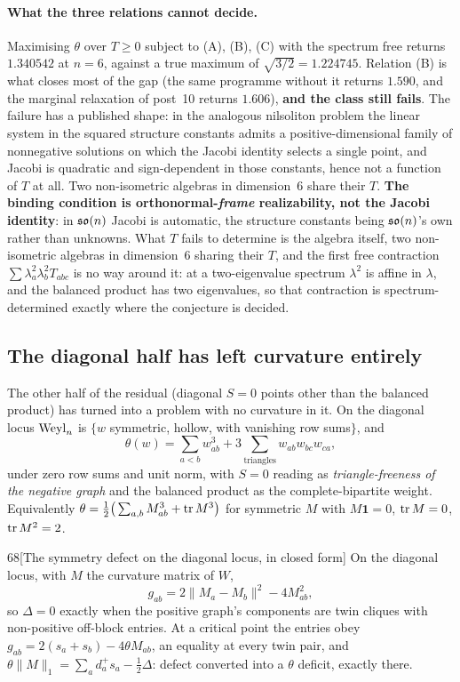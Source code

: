 \paragraph{What the three relations cannot decide.} Maximising $\theta$ over $T\ge0$ subject to (A), (B), (C) with the spectrum free returns $1.340542$ at $n=6$, against a true maximum of $\sqrt{3/2}=1.224745$. Relation (B) is what closes most of the gap (the same programme without it returns $1.590$, and the marginal relaxation of post~10 returns $1.606$), \textbf{and the class still fails}. The failure has a published shape: in the analogous nilsoliton problem the linear system in the squared structure constants admits a positive-dimensional family of nonnegative solutions on which the Jacobi identity selects a single point, and Jacobi is quadratic and sign-dependent in those constants, hence not a function of $T$ at all. Two non-isometric algebras in dimension~$6$ share their $T$. \textbf{The binding condition is orthonormal-\emph{frame} realizability, not the Jacobi identity}: in $\mathfrak{so}(n)$ Jacobi is automatic, the structure constants being $\mathfrak{so}(n)$'s own rather than unknowns. What $T$ fails to determine is the algebra itself, two non-isometric algebras in dimension~$6$ sharing their $T$, and the first free contraction $\sum\lambda_a^2\lambda_b^2T_{abc}$ is no way around it: at a two-eigenvalue spectrum $\lambda^2$ is affine in $\lambda$, and the balanced product has two eigenvalues, so that contraction is spectrum-determined exactly where the conjecture is decided.

\subsection{The diagonal half has left curvature entirely}\label{sec:diagonal}

The other half of the residual (diagonal $S=0$ points other than the balanced product) has turned into a problem with no curvature in it. On the diagonal locus $\mathrm{Weyl}_n$ is $\{w$ symmetric, hollow, with vanishing row sums$\}$, and
\[
\theta(w)=\sum_{a<b}w_{ab}^3+3\!\!\sum_{\text{triangles}}\!\!w_{ab}w_{bc}w_{ca},
\]
under zero row sums and unit norm, with $S=0$ reading as \emph{triangle-freeness of the negative graph} and the balanced product as the complete-bipartite weight. Equivalently $\theta=\tfrac12\big(\sum_{a,b}M_{ab}^3+\operatorname{tr} M^3\big)$ for symmetric $M$ with $M\mathbf1=0$, $\operatorname{tr} M=0$, $\operatorname{tr} M^2=2$.

\begin{Lem}{68}[The symmetry defect on the diagonal locus, in closed form]
On the diagonal locus, with $M$ the curvature matrix of $W$,
\[
g_{ab}=2\|M_a-M_b\|^2-4M_{ab}^2,
\]
so $\Delta=0$ exactly when the positive graph's components are twin cliques with non-positive off-block entries. At a critical point the entries obey $g_{ab}=2(s_a+s_b)-4\theta M_{ab}$, an equality at every twin pair, and $\theta\|M\|_1=\sum_ad_a^+s_a-\tfrac12\Delta$: defect converted into a $\theta$ deficit, exactly there.
\end{Lem}

